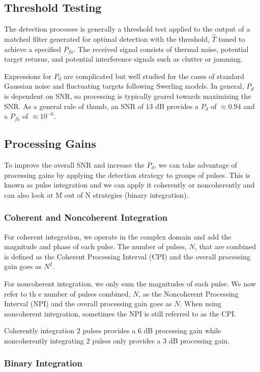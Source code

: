 \subsection{Threshold Testing}
The detection processes is generally a threshold test applied to the output of a matched filter generated for optimal detection with the threshold, $\hat{T}$ tuned to achieve a specified $P_{fa}$. The received signal consists of thermal noise, potential target returns, and potential interference signals such as clutter or jamming.

Expressions for $P_d$ are complicated but well studied for the cases of standard Gaussian noise and fluctuating targets following Swerling models. In general, $P_d$ is dependent on SNR, so processing is typically geared towards maximizing the SNR. As a general rule of thumb, an SNR of $13$ dB provides a $P_d$ of $\approx 0.94$ and a $P_{fa}$ of $\approx 10^{-6}$.

\subsection{Processing Gains}
To improve the overall SNR and increase the $P_d$, we can take advantage of processing gains by applying the detection strategy to groups of pulses. This is known as pulse integration and we can apply it coherently or noncoherently and can also look at M out of N strategies (binary integration).

\subsubsection{Coherent and Noncoherent Integration}
For coherent integration, we operate in the complex domain and add the magnitude and phase of each pulse. The number of pulses, $N$, that are combined is defined as the Coherent Processing Interval (CPI) and the overall processing gain goes as $N^2$.

For noncoherent integration, we only sum the magnitudes of each pulse. We now refer to th e number of pulses combined, $N$, as the Noncoherent Processing Interval (NPI) and the overall processing gain goes as $N$. When using noncoherent integration, sometimes the NPI is still referred to as the CPI.

Coherently integration $2$ pulses provides a $6$ dB processing gain while noncoherently integrating $2$ pulses only provides a $3$ dB processing gain.

\subsubsection{Binary Integration}